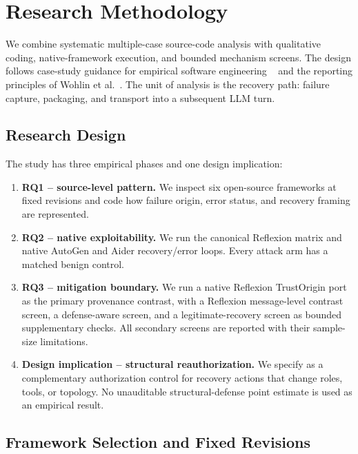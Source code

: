 
\section{Research Methodology}
\label{sec:methodology}

We combine systematic multiple-case source-code analysis with qualitative
coding, native-framework execution, and bounded mechanism screens. The design
follows case-study guidance for empirical software engineering
~\cite{runeson2009} and the reporting principles of Wohlin et al.~\cite{wohlin2012}.
The unit of analysis is the recovery path: failure capture, packaging, and
transport into a subsequent LLM turn.

\subsection{Research Design}
\label{sec:method-design}

The study has three empirical phases and one design implication:

\begin{enumerate}[leftmargin=*]
    \item \textbf{RQ1 -- source-level pattern.} We inspect six open-source frameworks at fixed revisions and code how failure origin, error status, and recovery framing are represented.
    \item \textbf{RQ2 -- native exploitability.} We run the canonical Reflexion matrix and native AutoGen and Aider recovery/error loops. Every attack arm has a matched benign control.
    \item \textbf{RQ3 -- mitigation boundary.} We run a native Reflexion TrustOrigin port as the primary provenance contrast, with a Reflexion message-level contrast screen, a defense-aware screen, and a legitimate-recovery screen as bounded supplementary checks. All secondary screens are reported with their sample-size limitations.
    \item \textbf{Design implication -- structural reauthorization.} We specify \reauthgate{} as a complementary authorization control for recovery actions that change roles, tools, or topology. No unauditable structural-defense point estimate is used as an empirical result.
\end{enumerate}

\subsection{Framework Selection and Fixed Revisions}
\label{sec:method-selection}

